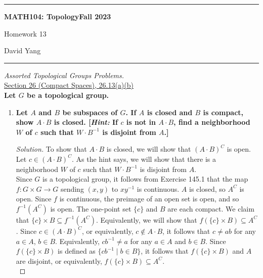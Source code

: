 \documentclass[11pt]{article}
\newenvironment{solution}
  {\renewcommand\qedsymbol{$\blacksquare$}\begin{proof}[Solution]}
  {\end{proof}}
\begin{document}
	\hrule
	\begin{center}
        \textbf{MATH104: Topology}\hfill \textbf{Fall 2023}\newline

		{\Large Homework 13}

		David Yang
	\end{center}

\hrule

\vspace{1em}

\textit{Assorted Topological Groups Problems.} \\

\underline{Section 26 (Compact Spaces), 26.13(a)(b)} \\

\textbf{Let $G$ be a topological group.}
\begin{enumerate}
    \item \textbf{Let $A$ and $B$ be subspaces of $G$. If $A$ is closed and $B$ is compact, show $A \cdot B$ is closed. [\textit{Hint:} If $c$ is not in $A \cdot B$, find a neighborhood $W$ of $c$ such that
    $W \cdot B^{-1}$ is disjoint from $A$.]}

    \begin{solution}
    To show that $A \cdot B$ is closed, we will show that $(A \cdot B)^C$ is open. Let $c \in (A \cdot B)^C$. As the hint says, we will show that there is a neighborhood $W$ of $c$ such that
    $W \cdot B^{-1}$ is disjoint from $A$. \\
    
    Since $G$ is a topological group, it follows from Exercise 145.1 that the map $f \colon G \times G \rightarrow G$ sending $(x, y)$ to $xy^{-1}$ is continuous. $A$ is closed, so $A^C$ is open. Since $f$ is continuous, the preimage of an open set is open, and so $f^{-1}(A^C)$ is open. The one-point set $\{ c \}$ and $B$ are each compact. We claim that $\{c\} \times B \subseteq f^{-1}(A^C)$. 
    Equivalently, we will show that $f(\{ c \} \times B) \subseteq A^C$. Since $c \in (A \cdot B)^C$, or equivalently, $c \notin A \cdot B$, it follows that $c \neq ab$ for any $a \in A$, $b \in B$. Equivalently, $c b^{-1} \neq a$ for any $a \in A$ and $b \in B$. Since $f(\{ c \} \times B)$ is defined as $\{cb^{-1} \mid b \in B\}$, 
    it follows that $f(\{c \} \times B)$ and $A$ are disjoint, or equivalently, $f(\{ c \} \times B) \subseteq A^C$. \\


\end{solution}
\end{enumerate}
\end{document}
